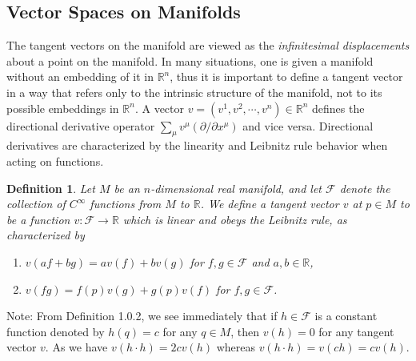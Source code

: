 \documentclass[11pt, onesided]{book}
\theoremstyle{break}
\theoremstyle{break}
\newtheorem{defn}{Definition}[thm]
\newcommand{\R}{\mathbb{R}}
\newcommand{\pd}{\partial}
\newcommand{\note}{\color{red}Note: \color{black}}
\begin{document}
\subsection{Vector Spaces on Manifolds}
The tangent vectors on the manifold are viewed as the \textit{infinitesimal displacements} about a point on the manifold. In many situations, one is given a manifold without an embedding of it in $\R^n$, thus it is important to define a tangent vector in a way that refers only to the intrinsic structure of the manifold, not to its possible embeddings in $\R^n$. A vector $v=(v^1, v^2, \cdots, v^n) \in \R^n$ defines the directional derivative operator $\sum_\mu v^\mu(\pd/ \pd x^\mu)$ and vice versa. Directional derivatives are characterized by the linearity and Leibnitz rule behavior when acting on functions.
\begin{defn}
Let $M$ be an $n$-dimensional real manifold, and let $\mathcal{F}$ denote the collection of $C^\infty$  functions from $M$ to $\R$. We define a tangent vector $v$ at $p \in M$ to be a function $v:\mathcal{F}\to \R$ which is linear and obeys the Leibnitz rule, as characterized by
\begin{enumerate}[topsep=3pt,itemsep=-1ex,partopsep=1ex,parsep=1ex]
\item $v(af+bg) = av(f) + bv(g) $ for $f,g \in \mathcal{F}$ and $a,b \in \R$,
\item $v(fg) = f(p) v(g) + g(p) v(f)$ for $f,g \in \mathcal{F}$.
\end{enumerate}
\end{defn}

\note From Definition 1.0.2, we see immediately that if $h \in \mathcal{F}$ is a constant function denoted by $h(q) = c$ for any $q \in M$, then $v(h) = 0$ for any tangent vector $v$. As we have $v(h\cdot h) = 2cv(h)$ whereas $v(h\cdot h) = v(ch) = cv(h)$. \\
\end{document}
